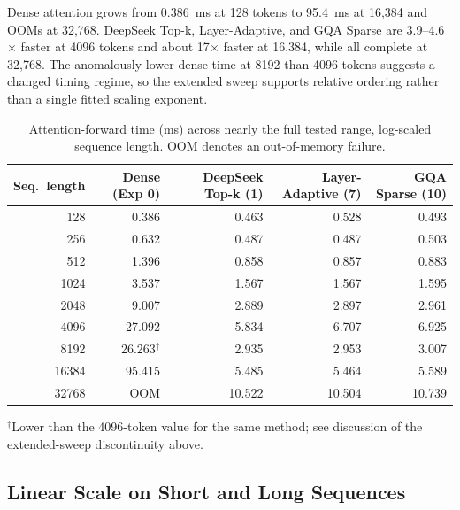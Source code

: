 \documentclass[11pt]{article}
\begin{document}
Dense attention grows from 0.386~ms at 128 tokens to 95.4~ms at 16{,}384 and
OOMs at 32{,}768. DeepSeek Top-k, Layer-Adaptive, and GQA Sparse are
3.9--4.6$\times$ faster at 4096 tokens and about 17$\times$ faster at
16{,}384, while all complete at 32{,}768. The anomalously lower dense time at
8192 than 4096 tokens suggests a changed timing regime, so the extended sweep
supports relative ordering rather than a single fitted scaling exponent.

\begin{table}[ht]
  \centering
  \small
  \caption{Attention-forward time (ms) across nearly the full tested range,
  log-scaled sequence length. OOM denotes an out-of-memory failure.}
  \label{tab:loglog}
  \begin{tabular}{@{}rrrrr@{}}
    \toprule
    Seq.\ length & Dense (Exp 0) & DeepSeek Top-k (1) & Layer-Adaptive (7) & GQA Sparse (10) \\
    \midrule
    128    & 0.386 & 0.463 & 0.528 & 0.493 \\
    256    & 0.632 & 0.487 & 0.487 & 0.503 \\
    512    & 1.396 & 0.858 & 0.857 & 0.883 \\
    1024   & 3.537 & 1.567 & 1.567 & 1.595 \\
    2048   & 9.007 & 2.889 & 2.897 & 2.961 \\
    4096   & 27.092 & 5.834 & 6.707 & 6.925 \\
    8192   & 26.263$^\dagger$ & 2.935 & 2.953 & 3.007 \\
    16384  & 95.415 & 5.485 & 5.464 & 5.589 \\
    32768  & OOM & 10.522 & 10.504 & 10.739 \\
    \bottomrule
  \end{tabular}

  \vspace{4pt}
  \raggedright\footnotesize $^\dagger$Lower than the 4096-token value for the
  same method; see discussion of the extended-sweep discontinuity above.
\end{table}

\subsection{Linear Scale on Short and Long Sequences}
\end{document}
